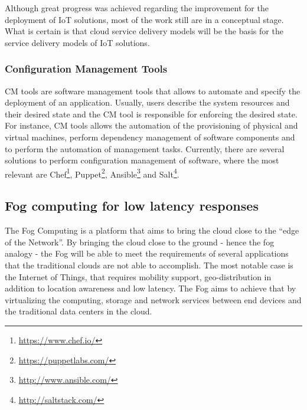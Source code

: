 Although great progress was achieved regarding the improvement for the deployment of \gls{IoT}
solutions, most of the work still are in a conceptual stage. What is certain is that cloud service
delivery models will be the basis for the service delivery models of \gls{IoT} solutions.\\

\subsubsection{Configuration Management Tools}
\label{subs:cm_tools}
\gls{CM} tools are software management tools that allows to automate and specify the deployment of an
application. Usually, users describe the system resources and their desired state and the \gls{CM}
tool is responsible for enforcing the desired state. For instance, \gls{CM} tools allows the automation
of the provisioning of physical and virtual machines, perform dependency management of software
components and to perform the automation of management tasks. Currently, there are several solutions
to perform configuration management of software, where the most relevant are Chef\footnote{\url{https://www.chef.io/}},
Puppet\footnote{\url{https://puppetlabs.com/}}, Ansible\footnote{\url{http://www.ansible.com/}} and
Salt\footnote{\url{http://saltstack.com/}}.\\

\subsection{Fog computing for low latency responses}
\label{sub:fog_computing}
The Fog Computing \cite{bonomi2012fog} is a platform that aims to bring the cloud close to the ``edge
of the Network''. By bringing the cloud close to the ground - hence the fog analogy - the Fog will be
able to meet the requirements of several applications that the traditional clouds are not able to
accomplish. The most notable case is the Internet of Things, that requires mobility support,
geo-distribution in addition to location awareness and low latency. The Fog aims to achieve that by
virtualizing the computing, storage and network services between end devices and the
traditional data centers in the cloud.\\

